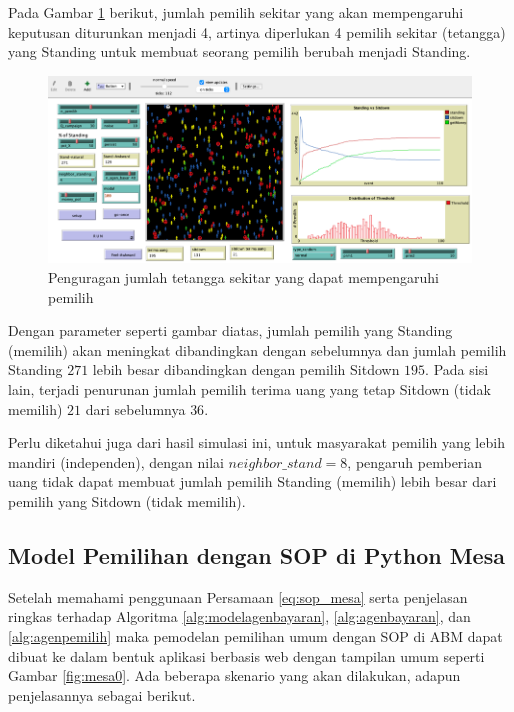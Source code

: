 Pada Gambar \ref{fig:pemilusop12} berikut, jumlah pemilih sekitar yang akan mempengaruhi keputusan diturunkan menjadi 4, artinya diperlukan 4 pemilih sekitar (tetangga) yang Standing untuk membuat seorang pemilih berubah menjadi Standing.

\begin{figure}[H]
\centering
\includegraphics[width=\linewidth]{images/ch03/pemilusop12}
\caption{Penguragan jumlah tetangga sekitar yang dapat mempengaruhi pemilih}
\label{fig:pemilusop12}
\end{figure}

Dengan parameter seperti gambar diatas, jumlah pemilih yang Standing (memilih) akan meningkat dibandingkan dengan sebelumnya dan jumlah pemilih Standing $271$ lebih besar dibandingkan dengan pemilih Sitdown $195$. Pada sisi lain, terjadi penurunan jumlah pemilih terima uang yang tetap Sitdown (tidak memilih) $21$ dari sebelumnya $36$.

Perlu diketahui juga dari hasil simulasi ini, untuk masyarakat pemilih yang lebih mandiri (independen), dengan nilai $neighbor\_stand=8$, pengaruh pemberian uang tidak dapat membuat jumlah pemilih Standing (memilih) lebih besar dari pemilih yang Sitdown (tidak memilih).

\subsection{Model Pemilihan dengan SOP di Python Mesa}

Setelah memahami penggunaan Persamaan \ref{eq:sop_mesa} serta penjelasan ringkas terhadap Algoritma \ref{alg:modelagenbayaran}, \ref{alg:agenbayaran}, dan \ref{alg:agenpemilih} maka pemodelan pemilihan umum dengan SOP di ABM dapat dibuat ke dalam bentuk aplikasi berbasis web \cite{Zikri_Modified_Standing_Ovation_2021} dengan tampilan umum seperti Gambar \ref{fig:mesa0}. Ada beberapa skenario yang akan dilakukan, adapun penjelasannya sebagai berikut.


